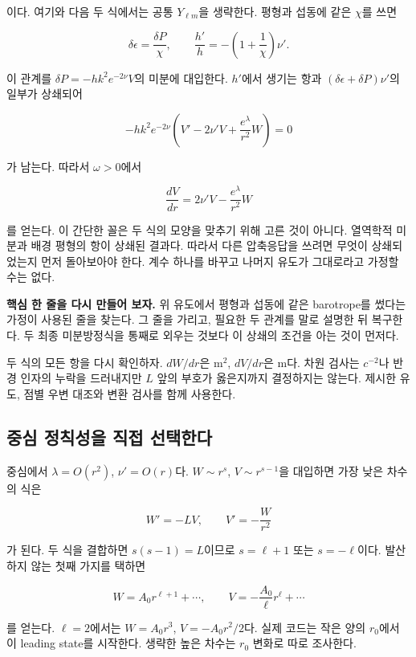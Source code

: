 \documentclass[
  10pt,
  a4paper,
]{article}
\begin{document}
이다. 여기와 다음 두 식에서는 공통 \(Y_{\ell m}\)을 생략한다. 평형과
섭동에 같은 \(\chi\)를 쓰면

\[
\delta\epsilon=\frac{\delta P}{\chi},
\qquad
\frac{h'}h=-\left(1+\frac1\chi\right)\nu'.
\]

이 관계를 \(\delta P=-hk^2e^{-2\nu}V\)의 미분에 대입한다. \(h'\)에서
생기는 항과 \((\delta\epsilon+\delta P)\nu'\)의 일부가 상쇄되어

\[
-hk^2e^{-2\nu}
\left(V'-2\nu'V+\frac{e^\lambda}{r^2}W\right)=0
\]

가 남는다. 따라서 \(\omega>0\)에서

\[
\boxed{\frac{dV}{dr}=2\nu'V-\frac{e^\lambda}{r^2}W}
\]

를 얻는다. 이 간단한 꼴은 두 식의 모양을 맞추기 위해 고른 것이 아니다.
열역학적 미분과 배경 평형의 항이 상쇄된 결과다. 따라서 다른 압축응답을
쓰려면 무엇이 상쇄되었는지 먼저 돌아보아야 한다. 계수 하나를 바꾸고
나머지 유도가 그대로라고 가정할 수는 없다.

\textbf{핵심 한 줄을 다시 만들어 보자.} 위 유도에서 평형과 섭동에 같은
barotrope를 썼다는 가정이 사용된 줄을 찾는다. 그 줄을 가리고, 필요한 두
관계를 말로 설명한 뒤 복구한다. 두 최종 미분방정식을 통째로 외우는
것보다 이 상쇄의 조건을 아는 것이 먼저다.

두 식의 모든 항을 다시 확인하자. \(dW/dr\)은 \(\mathrm{m^2}\),
\(dV/dr\)은 \(\mathrm m\)다. 차원 검사는 \(c^{-2}\)나 반경 인자의 누락을
드러내지만 \(L\) 앞의 부호가 옳은지까지 결정하지는 않는다. 제시한 유도,
점별 우변 대조와 변환 검사를 함께 사용한다.

\subsection{중심 정칙성을 직접
선택한다}\label{uxc911uxc2ec-uxc815uxce59uxc131uxc744-uxc9c1uxc811-uxc120uxd0dduxd55cuxb2e4}

중심에서 \(\lambda=O(r^2)\), \(\nu'=O(r)\)다. \(W\sim r^s\),
\(V\sim r^{s-1}\)을 대입하면 가장 낮은 차수의 식은

\[
W'=-LV,\qquad V'=-\frac{W}{r^2}
\]

가 된다. 두 식을 결합하면 \(s(s-1)=L\)이므로 \(s=\ell+1\) 또는
\(s=-\ell\)이다. 발산하지 않는 첫째 가지를 택하면

\[
W=A_0r^{\ell+1}+\cdots,
\qquad
V=-\frac{A_0}{\ell}r^\ell+\cdots
\]

를 얻는다. \(\ell=2\)에서는 \(W=A_0r^3\), \(V=-A_0r^2/2\)다. 실제 코드는
작은 양의 \(r_0\)에서 이 leading state를 시작한다. 생략한 높은 차수는
\(r_0\) 변화로 따로 조사한다.
\end{document}
